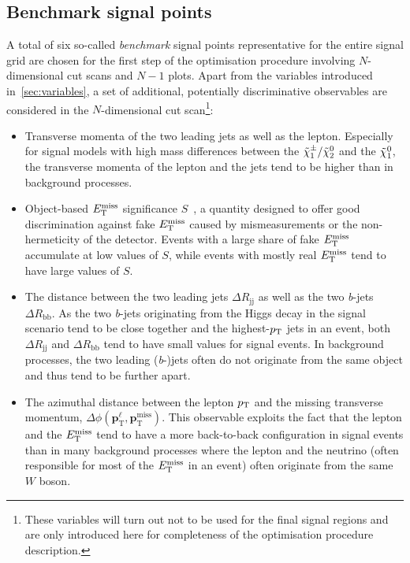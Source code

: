 \subsection{Benchmark signal points}

A total of six so-called \textit{benchmark} signal points representative for the entire signal grid are chosen for the first step of the optimisation procedure involving $N$-dimensional cut scans and $N-1$ plots. Apart from the variables introduced in~\cref{sec:variables}, a set of additional, potentially discriminative observables are considered in the $N$-dimensional cut scan\footnote{These variables will turn out not to be used for the final signal regions and are only introduced here for completeness of the optimisation procedure description.}:
\begin{itemize}
	\item Transverse momenta of the two leading jets as well as the lepton. Especially for signal models with high mass differences between the $\tilde{\chi}_1^\pm/\tilde{\chi}_2^0$ and the $\tilde{\chi}_1^0$, the transverse momenta of the lepton and the jets tend to be higher than in background processes.
	\item Object-based $E_{\textrm{T}}^{\textrm{miss}}$ significance $S$~\cite{met_significance:2294922}, a quantity designed to offer good discrimination against fake $E_{\textrm{T}}^{\textrm{miss}}$ caused by mismeasurements or the non-hermeticity of the detector. Events with a large share of fake $E_{\textrm{T}}^{\textrm{miss}}$ accumulate at low values of $S$, while events with mostly real $E_{\textrm{T}}^{\textrm{miss}}$ tend to have large values of $S$. 
	\item The distance between the two leading jets $\Delta R_\mathrm{jj}$ as well as the two \textit{b}-jets $\Delta R_\mathrm{bb}$. As the two \textit{b}-jets originating from the Higgs decay in the signal scenario tend to be close together and the highest-$p_{\textrm{T}}$ jets in an event, both $\Delta R_\mathrm{jj}$ and $\Delta R_\mathrm{bb}$ tend to have small values for signal events. In background processes, the two leading (\textit{b}-)jets often do not originate from the same object and thus tend to be further apart.
	\item The azimuthal distance between the lepton $p_{\textrm{T}}$ and the missing transverse momentum, $\Delta \phi (\boldsymbol{p}_\mathrm{T}^\ell, \boldsymbol{p}_\mathrm{T}^\mathrm{miss})$. This observable exploits the fact that the lepton and the $E_{\textrm{T}}^{\textrm{miss}}$ tend to have a more back-to-back configuration in signal events than in many background processes where the lepton and the neutrino (often responsible for most of the $E_{\textrm{T}}^{\textrm{miss}}$ in an event) often originate from the same $W$ boson.
\end{itemize}

